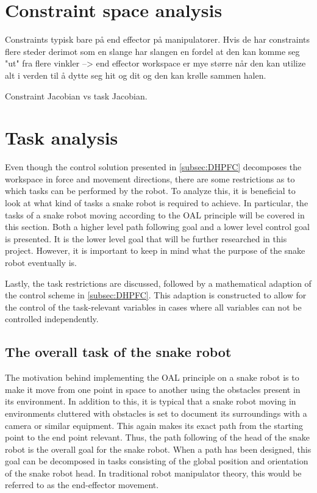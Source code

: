 \section{Constraint space analysis}

Constraints typisk bare på end effector på manipulatorer. Hvis de har constraints flere steder derimot som en slange har slangen en fordel at den kan komme seg "ut" fra flere vinkler --> end effector workspace er mye større når den kan utilize alt i verden til å dytte seg hit og dit og den kan krølle sammen halen.

Constraint Jacobian vs task Jacobian.


\section{Task analysis}

Even though the control solution presented in \ref{subsec:DHPFC} decomposes the workspace in force and movement directions, there are some restrictions as to which tasks can be performed by the robot. To analyze this, it is beneficial to look at what kind of tasks a snake robot is required to achieve. In particular, the tasks of a snake robot moving according to the OAL principle will be covered in this section. Both a higher level path following goal and a lower level control goal is presented. It is the lower level goal that will be further researched in this project. However, it is important to keep in mind what the purpose of the snake robot eventually is.

Lastly, the task restrictions are discussed, followed by a mathematical adaption of the control scheme in \ref{subsec:DHPFC}. This adaption is constructed to allow for the control of the task-relevant variables in cases where all variables can not be controlled independently.

\subsection{The overall task of the snake robot}

The motivation behind implementing the OAL principle on a snake robot is to make it move from one point in space to another using the obstacles present in its environment. In addition to this, it is typical that a snake robot moving in environments cluttered with obstacles is set to document its surroundings with a camera or similar equipment. This again makes its exact path from the starting point to the end point relevant. Thus, the path following of the head of the snake robot is the overall goal for the snake robot. When a path has been designed, this goal can be decomposed in tasks consisting of the global position and orientation of the snake robot head. In traditional robot manipulator theory, this would be referred to as the end-effector movement. 


